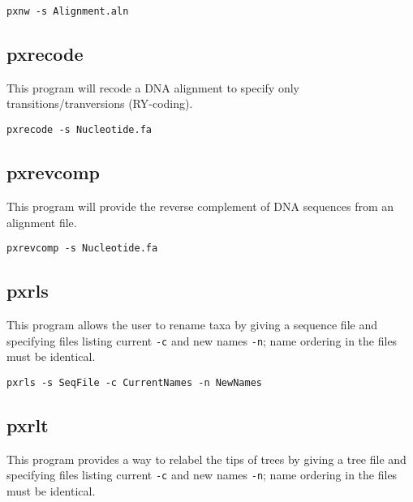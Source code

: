 \documentclass[12pt,letterpaper]{memoir}
\begin{document}
\begin{flushleft}
\begin{verbatim}
pxnw -s Alignment.aln
\end{verbatim}
\end{flushleft}

\subsection{pxrecode}

This program will recode a DNA alignment to specify only transitions/tranversions (RY-coding).

\begin{flushleft}
\begin{verbatim}
pxrecode -s Nucleotide.fa
\end{verbatim}
\end{flushleft}

\subsection{pxrevcomp}

This program will provide the reverse complement of DNA sequences from an alignment file.

\begin{flushleft}
\begin{verbatim}
pxrevcomp -s Nucleotide.fa
\end{verbatim}
\end{flushleft}

\subsection{pxrls}

This program allows the user to rename taxa by giving a sequence file and specifying files listing current \texttt{-c} and new names \texttt{-n}; name ordering in the files must be identical.

\begin{flushleft}
\begin{verbatim}
pxrls -s SeqFile -c CurrentNames -n NewNames
\end{verbatim}
\end{flushleft}


\subsection{pxrlt}

This program provides a way to relabel the tips of trees by giving a tree file and specifying files listing current \texttt{-c} and new names \texttt{-n}; name ordering in the files must be identical.
\end{document}
